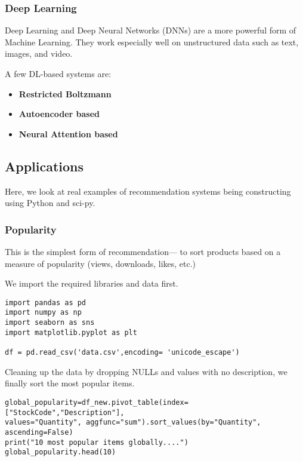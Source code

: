 \documentclass{article}
\begin{document}
\subsubsection{Deep Learning}

Deep Learning and Deep Neural Networks (DNNs) are a more powerful form of Machine Learning. They work especially well on unstructured data such as text, images, and video.

\noindent A few DL-based systems are:

\begin{itemize}
    \item{\textbf{Restricted Boltzmann}}
    \item{\textbf{Autoencoder based}}
    \item{\textbf{Neural Attention based}}
\end{itemize}

\subsection{Applications}

Here, we look at real examples of recommendation systems being constructing using Python and sci-py.

\subsubsection{Popularity}

This is the simplest form of recommendation— to sort products based on a measure of popularity (views, downloads, likes, etc.)

\medskip

\noindent We import the required libraries and data first.

\begin{lstlisting}
import pandas as pd
import numpy as np
import seaborn as sns
import matplotlib.pyplot as plt

df = pd.read_csv('data.csv',encoding= 'unicode_escape')
\end{lstlisting}

\noindent Cleaning up the data by dropping NULLs and values with no description, we finally sort the most popular items.

\begin{lstlisting}
global_popularity=df_new.pivot_table(index=["StockCode","Description"],
values="Quantity", aggfunc="sum").sort_values(by="Quantity", ascending=False)
print("10 most popular items globally....")
global_popularity.head(10)
\end{lstlisting}
\end{document}
